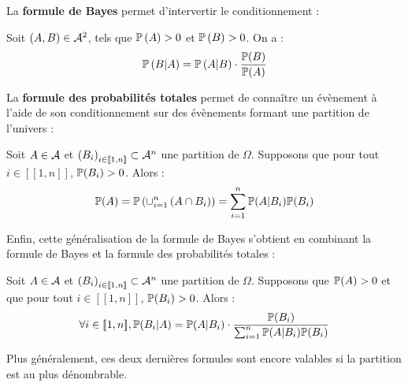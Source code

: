 \documentclass[../integ-proba.tex]{subfiles}
\begin{document}
    La \textbf{formule de Bayes} permet d'intervertir le conditionnement :

    \begin{thm}
        Soit $\left( A,B \right) \in \mathcal{A}^2$, tels que $\mathbb{P}\left( A \right) > 0$ et $\mathbb{P}\left( B \right) > 0$.
        On a :
        \begin{displaymath}
            \mathbb{P} \left( B | A \right) = \mathbb{P}\left( A | B \right) \cdot \frac{\mathbb{P}(B)}{\mathbb{P}(A)}
        \end{displaymath}
    \end{thm}

    La \textbf{formule des probabilités totales} permet de connaître un évènement à l'aide de son conditionnement sur des évènements formant une partition de l'univers :

    \begin{thm}
        Soit $A \in \mathcal{A}$ et $\left( B_i \right)_{i \in [\![1,n]\!]} \subset \mathcal{A}^n$ une partition de $\Omega$.
        Supposons que pour tout $i \in [\![1,n]\!]$, $\mathbb{P}(B_i) > 0$.
        Alors :
        \begin{displaymath}
            \mathbb{P}(A) = \mathbb{P}\left(\cup_{i = 1}^n \left(A \cap B_i \right)\right) = \sum_{i = 1}^n \mathbb{P}(A | B_i) \mathbb{P}(B_i)
        \end{displaymath}
    \end{thm}

    Enfin, cette généralisation de la formule de Bayes s'obtient en combinant la formule de Bayes et la formule des probabilités totales :

    \begin{thm}
        Soit $A \in \mathcal{A}$ et $\left( B_i \right)_{i \in [\![1,n]\!]} \subset \mathcal{A}^n$ une partition de $\Omega$.
        Supposons que $\mathbb{P}(A) > 0$ et que pour tout $i \in [\![1,n]\!]$, $\mathbb{P}(B_i) > 0$.
        Alors :
        \begin{displaymath}
            \forall i \in [\![1,n]\!], \mathbb{P}(B_i | A) = \mathbb{P}(A | B_i) \cdot \frac{\mathbb{P}(B_i)}{\sum_{i = 1}^n \mathbb{P}(A | B_i) \mathbb{P}(B_i)}
        \end{displaymath}
    \end{thm}

    \begin{rem}
        Plus généralement, ces deux dernières formules sont encore valables si la partition est au plus dénombrable.
    \end{rem}
\end{document}
